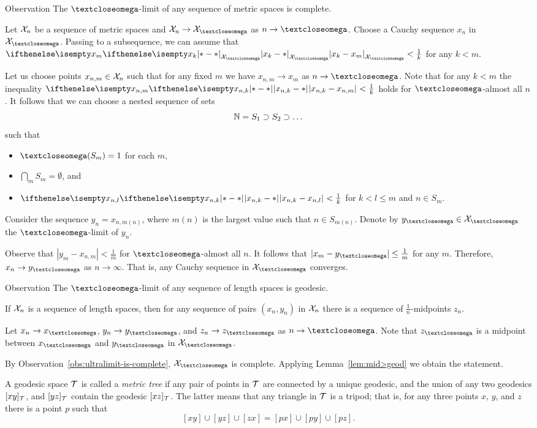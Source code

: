 \begin{thm}{Observation}\label{obs:ultralimit-is-complete}
The $\o$-limit of any sequence of metric spaces is complete. 
\end{thm}

Let $\mathcal{X}_n$ be a sequence of metric spaces and $\spc{X}_n\to\spc{X}_\o$ as $n\to\o$.
Choose a Cauchy sequence $x_n$ in $\spc{X}_\o$.
Passing to a subsequence, we can assume that $\dist{x_k}{x_{m}}{\spc{X}_\o}<\tfrac1{k}$ for any $k<m$.

Let us choose points $x_{n,m}\in\spc{X}_n$ such that for any fixed $m$ we have $x_{n,m}\to x_m$ as $n\to\o$.
Note that for any $k<m$ the inequality $\dist{x_{n,k}}{x_{n,m}}{}<\tfrac1{k}$ holds for $\o$-almost all $n$.
It follows that we can choose a nested sequence of sets 
\[\NN= S_1\supset S_2\supset\dots\] 
such that 
\begin{itemize}
\item $\o(S_m)=1$ for each $m$, 
\item $\bigcap_m S_m=\emptyset$, and
\item $\dist{x_{n,k}}{x_{n,l}}{}<\tfrac1{k}$ for $k<l\le m$ and $n\in S_m$.
\end{itemize}

Consider the sequence $y_n=x_{n,m(n)}$, where $m(n)$ is the largest value such that $n\in S_{m(n)}$.
Denote by $y_\o\in \spc{X}_\o$ the $\o$-limit of $y_n$.

Observe that $|y_m-x_{n,m}|<\tfrac1{m}$ for $\o$-almost all $n$.
It follows that $|x_m-y_\o|\le \tfrac1{m}$ for any $m$.
Therefore, $x_n\to y_\o$ as $n\to \infty$.
That is, any Cauchy sequence in $\spc{X}_\o$ converges.
\qeds


\begin{thm}{Observation}\label{obs:ultralimit-is-geodesic}
The $\o$-limit of any sequence of length spaces is geodesic. 
\end{thm}

If $\mathcal{X}_n$ is a sequence of length spaces, then for any sequence of pairs $(x_n, y_n)$ in $\mathcal{X}_n$ there is a sequence of $\tfrac1n$-midpoints $z_n$.

Let $x_n\to x_\o$, $y_n\to y_\o$, and $z_n\to z_\o$ as $n\to \o$.
Note that $z_\o$ is a midpoint between $x_\o$ and $y_\o$ in $\spc{X}_\o$.

By Observation~\ref{obs:ultralimit-is-complete}, $\spc{X}_\o$ is complete.
Applying Lemma~\ref{lem:mid>geod} we obtain the statement.
\qeds

A geodesic space $\mathcal{T}$ is called a \emph{metric tree} if any pair of points in $\mathcal{T}$ are connected by a unique geodesic,
and the union of any two geodesics $[xy]_{\mathcal{T}}$, and $[yz]_{\mathcal{T}}$ contain the geodesic $[xz]_{\mathcal{T}}$.
The latter means that any triangle in $\mathcal{T}$ is a tripod;
that is, for any three points $x$, $y$, and $z$ there is a point $p$ such that 
\[[xy]\cup[yz]\cup[zx]=[px]\cup[py]\cup[pz].\]

